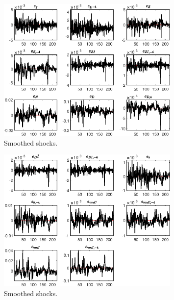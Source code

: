  
\begin{figure}[H]
\centering 
\includegraphics[width=0.80\textwidth]{BRS_sectoral_rest/graphs/BRS_sectoral_rest_SmoothedShocks1}
\caption{Smoothed shocks.}\label{Fig:SmoothedShocks:1}
\end{figure}

\begin{figure}[H]
\centering 
\includegraphics[width=0.80\textwidth]{BRS_sectoral_rest/graphs/BRS_sectoral_rest_SmoothedShocks2}
\caption{Smoothed shocks.}\label{Fig:SmoothedShocks:2}
\end{figure}


